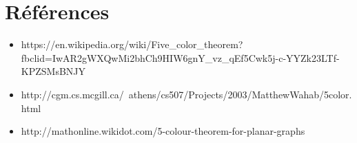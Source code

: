 \documentclass[a4paper, 11pt, oneside]{article}
\begin{document}
	\section{Références}
	\begin{itemize}
		\item https://en.wikipedia.org/wiki/Five\_color\_theorem?fbclid=IwAR2gWXQwMi2bhCh9HIW6gnY\_vz\_qEf5Cwk5j-c-YYZk23LTf-KPZSMsBNJY
		\item http://cgm.cs.mcgill.ca/~athens/cs507/Projects/2003/MatthewWahab/5color.html
		\item http://mathonline.wikidot.com/5-colour-theorem-for-planar-graphs
	\end{itemize}
	
\end{document}
